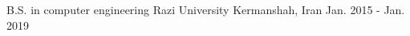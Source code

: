 

\begin{cventries}

  \cventry
    {B.S. in computer engineering} %
    {Razi University} %
    {Kermanshah, Iran} %
    {Jan. 2015 - Jan. 2019} %
    {
    }

\end{cventries}
